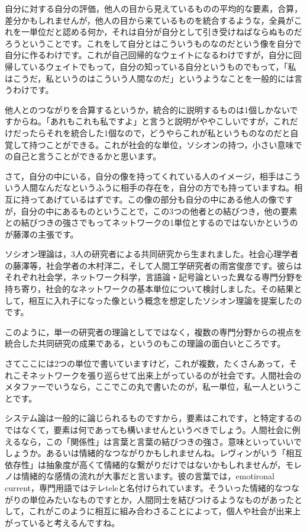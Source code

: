 \documentclass{ltjsbook}
\begin{document}
自分に対する自分の評価，他人の目から見えているものの平均的な要素，合算，差分かもしれませんが，他人の目から来ているものを統合するような，全員がこれを一単位だと認める何か，それは自分が自分として引き受けねばならぬものだろうということです。これをして自分とはこういうものなのだという像を自分で自分に作るわけです。これが自己回帰的なウェイトになるわけですが，自分に回帰しているウェイトでもって，自分の知っている自分というものでもって，「私はこうだ，私というのはこういう人間なのだ」というようなことを一般的には言うわけです。

他人とのつながりを合算するというか，統合的に説明するものは1個しかないですからね。「あれもこれも私ですよ」と言うと説明がややこしいですが，これだけだったらそれを統合した1個なので，どうやらこれが私というものなのだと自覚して持つことができる。これが社会的な単位，ソシオンの持つ，小さい意味での自己と言うことができるかと思います。

さて，自分の中にいる，自分の像を持ってくれている人のイメージ，相手はこういう人間なんだなというふうに相手の存在を，自分の方でも持っていますね。相互に持ってあげているはずです。この像の部分も自分の中にある他人の像ですが，自分の中にあるものということで，この3つの他者との結びつき，他の要素との結びつきの強さでもってネットワークの1単位とするのではないかというのが藤澤の主張です。

ソシオン理論は，3人の研究者による共同研究から生まれました。社会心理学者の藤澤等，社会学者の木村洋二，そして人間工学研究者の雨宮俊彦です。彼らはそれぞれ社会学，ネットワーク科学，言語論・記号論といった異なる専門分野を持ち寄り，社会的なネットワークの基本単位について検討しました。その結果として，相互に入れ子になった像という概念を想定したソシオン理論を提案したのです。

このように，単一の研究者の理論としてではなく，複数の専門分野からの視点を統合した共同研究の成果である，というのもこの理論の面白いところです。

さてここには2つの単位で書いていますけど，これが複数，たくさんあって，それこそネットワークを張り巡らせて出来上がっているのが社会です。人間社会のメタファーでいうなら，ここでこの丸で書いたのが，私一単位，私一人ということです。

システム論は一般的に論じられるものですから，要素はこれです，と特定するのではなくて，要素は何であっても構いませんというべきでしょう。人間社会に例えるなら，この「関係性」は言葉と言葉の結びつきの強さ。意味といっていいでしょうか。あるいは情緒的なつながりかもしれませんね。レヴィンがいう「相互依存性」は抽象度が高くて情緒的な繋がりだけではないかもしれませんが，モレノは情緒的な感情の流れが大事だと言います。彼の言葉では，emotironal current，専門用語ではテレteleと名付けられています。そういった情緒的なつながりの単位みたいなものですとか，人間同士を結びつけるようなものがあったとして，これがこのように相互に組み合わさることによって，個人や社会が出来上がっていると考えるんですね。
\end{document}
